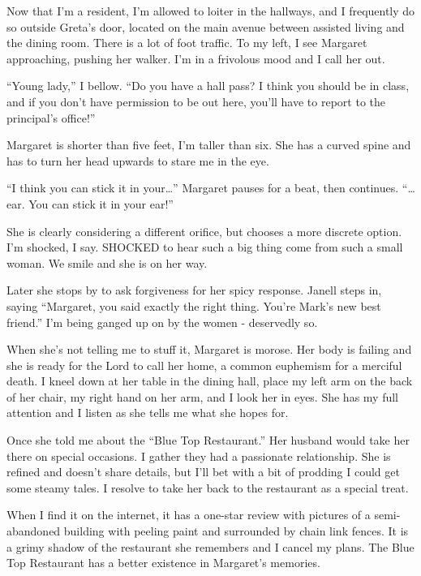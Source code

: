 \documentclass[
  letterpaper,
  DIV=11,
  numbers=noendperiod]{scrreprt}
\begin{document}

Now that I'm a resident, I'm allowed to loiter in the hallways, and I
frequently do so outside Greta's door, located on the main avenue
between assisted living and the dining room. There is a lot of foot
traffic. To my left, I see Margaret approaching, pushing her walker. I'm
in a frivolous mood and I call her out.

``Young lady,'' I bellow. ``Do you have a hall pass? I think you should
be in class, and if you don't have permission to be out here, you'll
have to report to the principal's office!''

Margaret is shorter than five feet, I'm taller than six. She has a
curved spine and has to turn her head upwards to stare me in the eye.

``I think you can stick it in your\ldots{}'' Margaret pauses for a beat,
then continues. ``\ldots ear. You can stick it in your ear!''

She is clearly considering a different orifice, but chooses a more
discrete option. I'm shocked, I say. SHOCKED to hear such a big thing
come from such a small woman. We smile and she is on her way.

Later she stops by to ask forgiveness for her spicy response. Janell
steps in, saying ``Margaret, you said exactly the right thing. You're
Mark's new best friend.'' I'm being ganged up on by the women -
deservedly so.

When she's not telling me to stuff it, Margaret is morose. Her body is
failing and she is ready for the Lord to call her home, a common
euphemism for a merciful death. I kneel down at her table in the dining
hall, place my left arm on the back of her chair, my right hand on her
arm, and I look her in eyes. She has my full attention and I listen as
she tells me what she hopes for.

Once she told me about the ``Blue Top Restaurant.'' Her husband would
take her there on special occasions. I gather they had a passionate
relationship. She is refined and doesn't share details, but I'll bet
with a bit of prodding I could get some steamy tales. I resolve to take
her back to the restaurant as a special treat.

When I find it on the internet, it has a one-star review with pictures
of a semi-abandoned building with peeling paint and surrounded by chain
link fences. It is a grimy shadow of the restaurant she remembers and I
cancel my plans. The Blue Top Restaurant has a better existence in
Margaret's memories.
\end{document}
